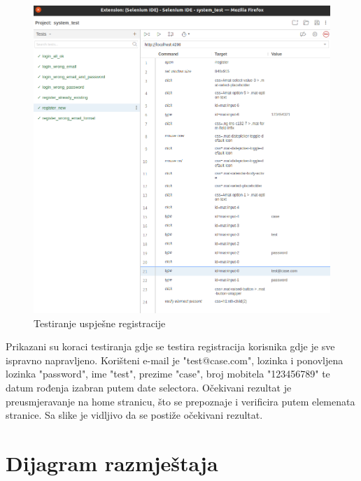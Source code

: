             \begin{figure}[H]
                \includegraphics[width=\textwidth]{slike/tests_system/register_new.png} %
                \caption{Testiranje uspješne registracije}
                \label{fig:struktura} %
            \end{figure}
            Prikazani su koraci testiranja gdje se testira registracija korisnika gdje je sve ispravno napravljeno. Korišteni e-mail je "test@case.com", lozinka i ponovljena lozinka "password", ime "test", prezime "case", broj mobitela "123456789" te datum rođenja izabran putem date selectora. Očekivani rezultat je preusmjeravanje na home stranicu, što se prepoznaje i verificira putem elemenata stranice. Sa slike je vidljivo da se postiže očekivani rezultat.
            
            \eject
		
		\section{Dijagram razmještaja}
			
			
			 
